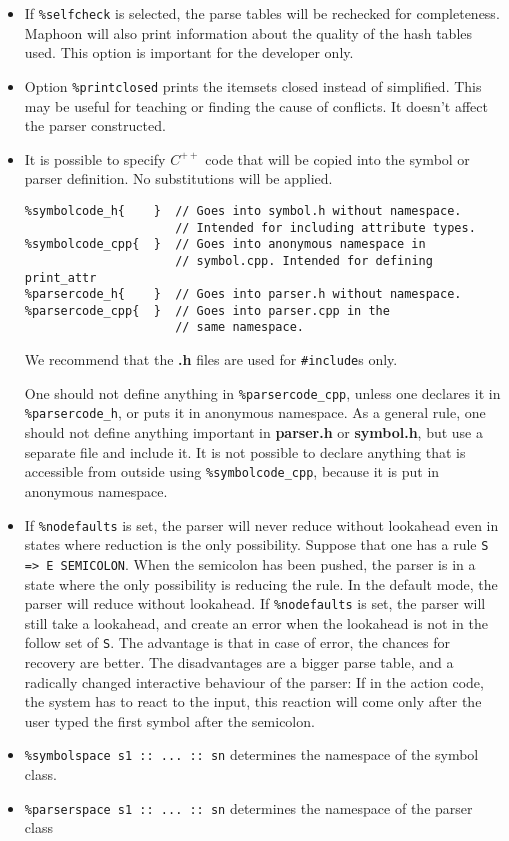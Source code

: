 \documentclass{article}
\begin{document}
\begin{itemize}
\item
   If \verb+%selfcheck+ is selected, the parse tables
   will be rechecked for completeness. 
   Maphoon will also print information about the quality
   of the hash tables used. 
   This option is important for the developer only. 

\item
   Option \verb+%printclosed+ prints the itemsets closed
   instead of simplified. 
   This may be useful for teaching or 
   finding the cause of conflicts. 
   It doesn't affect the parser constructed. 
\item
   It is possible to specify $ C^{++} $ code that will 
   be copied into the symbol or parser definition.
   No substitutions will be applied. 
\begin{verbatim}
%symbolcode_h{    }  // Goes into symbol.h without namespace.
                     // Intended for including attribute types.
%symbolcode_cpp{  }  // Goes into anonymous namespace in 
                     // symbol.cpp. Intended for defining print_attr
%parsercode_h{    }  // Goes into parser.h without namespace.
%parsercode_cpp{  }  // Goes into parser.cpp in the
                     // same namespace. \end{verbatim}
   We recommend that the {\bf .h} files are used for 
   \verb+#include+s only. 
   
   One should not define anything in \verb+%parsercode_cpp+,
   unless one declares it in \verb+%parsercode_h+, or
   puts it in anonymous namespace.
   As a general rule, one should not define 
   anything important in {\bf parser.h} or {\bf symbol.h}, but use
   a separate file and include it.   
   It is not possible to declare anything that is 
   accessible from outside using \verb+%symbolcode_cpp+,
   because it is put in anonymous namespace.

\item
   If \verb+%nodefaults+ is set, the parser will never reduce
   without lookahead even in states where reduction is the only
   possibility. 
   Suppose that one has a rule \verb+S => E SEMICOLON+.
   When the semicolon has been pushed, the parser is in a state 
   where the only possibility is reducing
   the rule. In the default mode, the parser will reduce
   without lookahead. If \verb+%nodefaults+ is set, the parser 
   will still take a lookahead, and create
   an error when the lookahead is not in the follow set
   of \verb+S+. 
   The advantage is that in case of error, the chances for recovery
   are better.
   The disadvantages are a bigger parse table, and 
   a radically changed interactive behaviour
   of the parser: If in the action code, the system
   has to react to the input, this reaction will come only after
   the user typed the first symbol after the semicolon. 
\item
   \verb+%symbolspace s1 :: ... :: sn+ determines the namespace
   of the symbol class.
\item
   \verb+%parserspace s1 :: ... :: sn+ determines the namespace
   of the parser class
\end{itemize}
\end{document}
